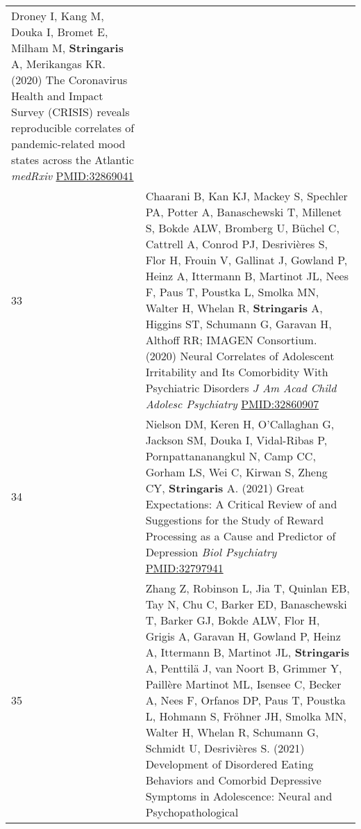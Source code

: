 \documentclass[
]{article}
\begin{document}
\begin{longtable}[]{@{}ll@{}}
\begin{minipage}[t]{0.94\columnwidth}
Droney I, Kang M, Douka I, Bromet E, Milham M, \textbf{Stringaris} A,
Merikangas KR. (2020) The Coronavirus Health and Impact Survey (CRISIS)
reveals reproducible correlates of pandemic-related mood states across
the Atlantic \emph{medRxiv} \url{PMID:32869041}\strut
\end{minipage}\tabularnewline
\begin{minipage}[t]{0.01\columnwidth}\raggedright
33\strut
\end{minipage} & \begin{minipage}[t]{0.94\columnwidth}\raggedright
Chaarani B, Kan KJ, Mackey S, Spechler PA, Potter A, Banaschewski T,
Millenet S, Bokde ALW, Bromberg U, Büchel C, Cattrell A, Conrod PJ,
Desrivières S, Flor H, Frouin V, Gallinat J, Gowland P, Heinz A,
Ittermann B, Martinot JL, Nees F, Paus T, Poustka L, Smolka MN, Walter
H, Whelan R, \textbf{Stringaris} A, Higgins ST, Schumann G, Garavan H,
Althoff RR; IMAGEN Consortium. (2020) Neural Correlates of Adolescent
Irritability and Its Comorbidity With Psychiatric Disorders \emph{J Am
Acad Child Adolesc Psychiatry} \url{PMID:32860907}\strut
\end{minipage}\tabularnewline
\begin{minipage}[t]{0.01\columnwidth}\raggedright
34\strut
\end{minipage} & \begin{minipage}[t]{0.94\columnwidth}\raggedright
Nielson DM, Keren H, O'Callaghan G, Jackson SM, Douka I, Vidal-Ribas P,
Pornpattananangkul N, Camp CC, Gorham LS, Wei C, Kirwan S, Zheng CY,
\textbf{Stringaris} A. (2021) Great Expectations: A Critical Review of
and Suggestions for the Study of Reward Processing as a Cause and
Predictor of Depression \emph{Biol Psychiatry} \url{PMID:32797941}\strut
\end{minipage}\tabularnewline
\begin{minipage}[t]{0.01\columnwidth}\raggedright
35\strut
\end{minipage} & \begin{minipage}[t]{0.94\columnwidth}\raggedright
Zhang Z, Robinson L, Jia T, Quinlan EB, Tay N, Chu C, Barker ED,
Banaschewski T, Barker GJ, Bokde ALW, Flor H, Grigis A, Garavan H,
Gowland P, Heinz A, Ittermann B, Martinot JL, \textbf{Stringaris} A,
Penttilä J, van Noort B, Grimmer Y, Paillère Martinot ML, Isensee C,
Becker A, Nees F, Orfanos DP, Paus T, Poustka L, Hohmann S, Fröhner JH,
Smolka MN, Walter H, Whelan R, Schumann G, Schmidt U, Desrivières S.
(2021) Development of Disordered Eating Behaviors and Comorbid
Depressive Symptoms in Adolescence: Neural and Psychopathological

\end{minipage}
\end{longtable}
\end{document}
